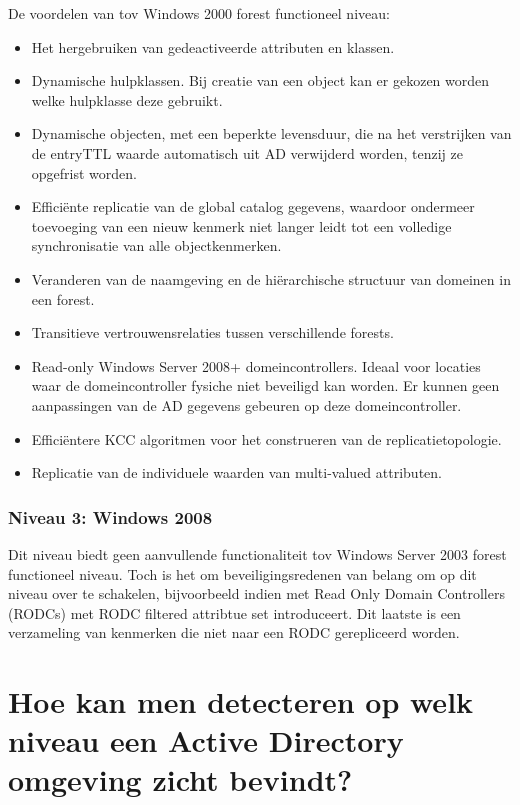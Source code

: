 De voordelen van tov Windows 2000 forest functioneel niveau:
\begin{itemize}
	\item Het hergebruiken van gedeactiveerde attributen en klassen.
	\item Dynamische hulpklassen. Bij creatie van een object kan er gekozen
		worden welke hulpklasse deze gebruikt.
	\item Dynamische objecten, met een beperkte levensduur, die na het
		verstrijken van de entryTTL waarde automatisch uit AD verwijderd
		worden, tenzij ze opgefrist worden.
	\item Efficiënte replicatie van de global catalog gegevens, waardoor
		ondermeer toevoeging van een nieuw kenmerk niet langer leidt tot
		een volledige synchronisatie van alle objectkenmerken.
	\item Veranderen van de naamgeving en de hiërarchische structuur van
		domeinen in een forest.
	\item Transitieve vertrouwensrelaties tussen verschillende forests.
	\item Read-only Windows Server 2008+ domeincontrollers. Ideaal voor
		locaties waar de domeincontroller fysiche niet beveiligd kan
		worden. Er kunnen geen aanpassingen van de AD gegevens gebeuren
		op deze domeincontroller.
	\item Efficiëntere KCC algoritmen voor het construeren van de
		replicatietopologie.
	\item Replicatie van de individuele waarden van multi-valued attributen.
\end{itemize}

\subsubsection{Niveau 3: Windows 2008}

Dit niveau biedt geen aanvullende functionaliteit tov Windows Server 2003 forest
functioneel niveau. Toch is het om beveiligingsredenen van belang om op dit
niveau over te schakelen, bijvoorbeeld indien met Read Only Domain Controllers
(RODCs) met RODC filtered attribtue set introduceert. Dit laatste is een
verzameling van kenmerken die niet naar een RODC gerepliceerd worden.

\section{Hoe kan men detecteren op welk niveau een Active Directory omgeving
zicht bevindt?}

